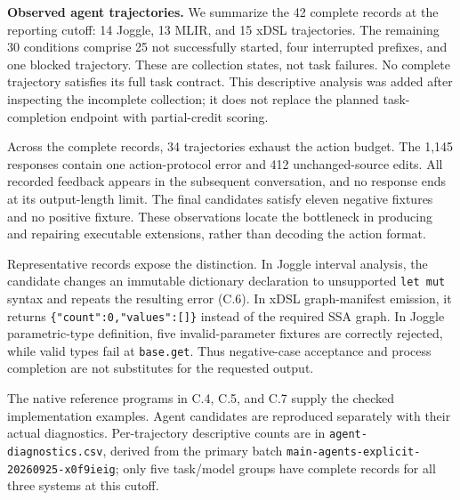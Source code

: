 \noindent\textbf{Observed agent trajectories.} We summarize the 42 complete records at the
reporting cutoff: 14 Joggle, 13 MLIR, and 15 xDSL trajectories. The remaining
30 conditions comprise 25 not successfully started, four interrupted prefixes,
and one blocked trajectory. These are collection states, not task failures.
No complete trajectory satisfies its full task contract. This descriptive
analysis was added after inspecting the incomplete collection; it does not
replace the planned task-completion endpoint with partial-credit scoring.

Across the complete records, 34 trajectories exhaust the action budget.
The 1,145 responses contain one action-protocol error and 412 unchanged-source
edits. All recorded feedback appears in the subsequent conversation, and no
response ends at its output-length limit. The final candidates satisfy eleven
negative fixtures and no positive fixture. These observations locate the
bottleneck in producing and repairing executable extensions, rather than
decoding the action format.

Representative records expose the distinction. In Joggle interval analysis,
the candidate changes an immutable dictionary declaration to unsupported
\texttt{let mut} syntax and repeats the resulting error (C.6). In xDSL graph-manifest
emission, it returns \texttt{\{"count":0,"values":[]\}} instead of the required SSA graph.
In Joggle parametric-type definition, five invalid-parameter fixtures are
correctly rejected, while valid types fail at \texttt{base.get}. Thus negative-case
acceptance and process completion are not substitutes for the requested output.

The native reference programs in C.4, C.5, and C.7 supply the checked implementation
examples. Agent candidates are reproduced separately with their actual
diagnostics. Per-trajectory descriptive counts are in
\texttt{agent-diagnostics.csv}, derived from the primary batch
\texttt{main-agents-explicit-20260925-x0f9ieig}; only five task/model groups have complete
records for all three systems at this cutoff.

